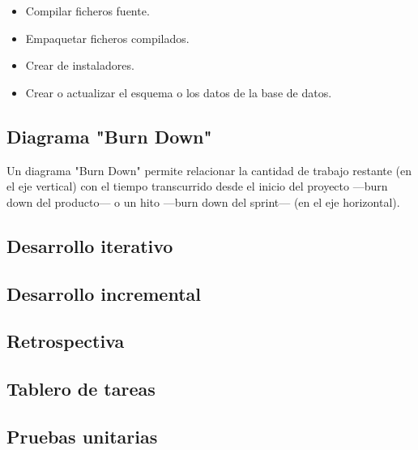 \begin{itemize}
	\item Compilar ficheros fuente.
	\item Empaquetar ficheros compilados.
	\item Crear de instaladores.
	\item Crear o actualizar el esquema o los datos de la base de datos.
\end{itemize}

\subsection{Diagrama "Burn Down"}

Un diagrama "Burn Down" permite relacionar la cantidad de trabajo restante (en el eje vertical) con el tiempo transcurrido desde el inicio del proyecto —burn down del producto— o un hito —burn down del sprint— (en el eje horizontal).

\subsection{Desarrollo iterativo}

\subsection{Desarrollo incremental}

\subsection{Retrospectiva}

\subsection{Tablero de tareas}

\subsection{Pruebas unitarias}